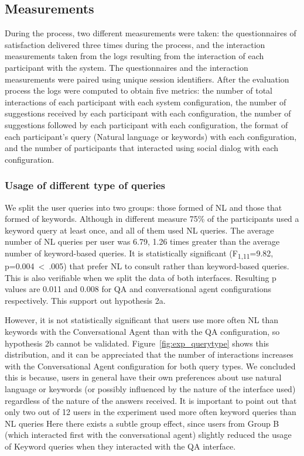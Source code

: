 \subsection{Measurements}

During the process, two different measurements were taken: the questionnaires of satisfaction delivered three times during the process, and the interaction measurements taken from the logs resulting from the interaction of each participant with the system. The questionnaires and the interaction measurements were paired using unique session identifiers. After the evaluation process the logs were computed to obtain five metrics: the number of total interactions of each participant with each system configuration, the number of suggestions received by each participant with each configuration, the number of suggestions followed by each participant with each configuration, the format of each participant's query (Natural language or keywords) with each configuration, and the number of participants that interacted using social dialog with each configuration.

\subsubsection{Usage of different type of queries}

We split the user queries into two groups: those formed of \ac{NL} and those that formed of keywords. Although in different measure 75\% of the participants used a keyword query at least once, and all of them used \ac{NL} queries. The average number of \ac{NL} queries per user was 6.79, 1.26 times greater than the average number of keyword-based queries. It is statistically significant (F\textsubscript{1,11}=9.82, p=0.004~\textless~.005) that prefer \ac{NL} to consult rather than keyword-based queries. This is also verifiable when we split the data of both interfaces. Resulting p values are 0.011 and 0.008 for \ac{QA} and conversational agent configurations respectively. This support out hypothesis 2a.

However, it is not statistically significant that users use more often \ac{NL} than keywords with the Conversational Agent than with the QA configuration, so hypothesis 2b cannot be validated. Figure~\ref{fig:exp_querytype} shows this distribution, and it can be appreciated that the number of interactions increases with the Conversational Agent configuration for both query types.
We concluded this is because, users in general have their own preferences about use natural language or keywords (or possibly influenced by the nature of the interface used) regardless of the nature of the answers received.
It is important to point out that only two out of 12 users in the experiment used more often keyword queries than \ac{NL} queries
Here there exists a subtle group effect, since users from Group B (which interacted first with the conversational agent) slightly reduced the usage of Keyword queries when they interacted with the \ac{QA} interface.

